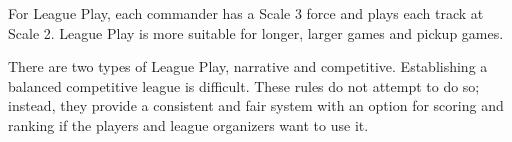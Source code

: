 For League Play, each commander has a Scale 3 force and plays each track at Scale 2.
League Play is more suitable for longer, larger games and pickup games.

There are two types of League Play, narrative and competitive.
Establishing a balanced competitive league is difficult.
These rules do not attempt to do so; instead, they provide a consistent and fair system with an option for scoring and ranking if the players and league organizers want to use it.
